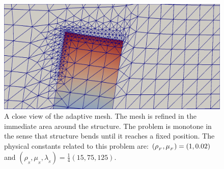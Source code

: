 \begin{figure}
  \label{selim:fig:channel_zoom_mesh}
  \caption{A close view of the adaptive mesh. The mesh is refined in
    the immediate area around the structure. The problem is monotone
    in the sense that structure bends until it reaches a fixed
    position. The physical constants related to this problem are:
    $(\rho_{_{F}},\mu_{_{F}}) = (1, 0.02)$ and $(\rho_{_{S}},\mu_{_{S}},
    \lambda_{_{S}}) = \tfrac{1}{4}(15, 75, 125)$.}
  \includegraphics[width=1.0\textwidth]{chapters/selim/png/channel_test_zoom.png}
\end{figure}


